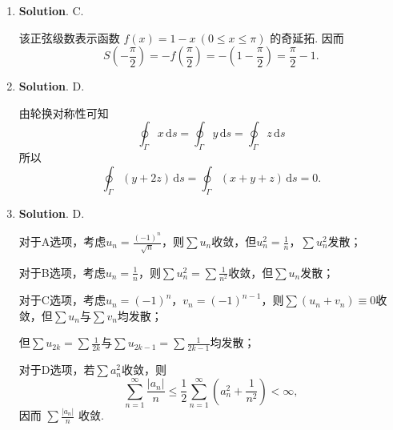 \documentclass[../main.tex]{subfiles}
\begin{document}
\begin{enumerate}
    \item \textbf{Solution}. C.

          该正弦级数表示函数 \(f(x)=1-x\ (0\le x\le \pi)\) 的奇延拓. 因而
          \[
              S\left(-\frac{\pi}{2}\right)=-f\left(\frac{\pi}{2}\right)
              =-\left(1-\frac{\pi}{2}\right)
              =\frac{\pi}{2}-1.
          \]

    \item \textbf{Solution}. D.

          由轮换对称性可知
          \[
              \oint_\Gamma x\,\mathrm{d}s=\oint_\Gamma y\,\mathrm{d}s=\oint_\Gamma z\,\mathrm{d}s
          \]
          所以
          \[
              \oint_\Gamma (y+2z)\,\mathrm{d}s=\oint_\Gamma (x+y+z)\,\mathrm{d}s=0.
          \]

    \item \textbf{Solution}. D.

          对于A选项，考虑$u_n=\frac{(-1)^n}{\sqrt{n}}$，则$\sum u_n$收敛，但$u_n^2=\frac{1}{n}$，$\sum u_n^2$发散；

          对于B选项，考虑$u_n=\frac{1}{n}$，则$\sum u_n^2=\sum \frac{1}{n^2}$收敛，但$\sum u_n$发散；

          对于C选项，考虑$u_n=(-1)^n$，$v_n=(-1)^{n-1}$，则$\sum (u_n+v_n)\equiv0$收敛，但$\sum u_n$与$\sum v_n$均发散；

          但$\sum u_{2k}=\sum \frac{1}{2k}$与$\sum u_{2k-1}=\sum \frac{1}{2k-1}$均发散；

          对于D选项，若$\sum a_n^2$收敛，则
          \[
              \sum_{n=1}^{\infty}\frac{|a_n|}{n}
              \le \frac{1}{2}\sum_{n=1}^{\infty}\left(a_n^2+\frac{1}{n^2}\right) < \infty,
          \]
          因而 \(\sum \frac{|a_n|}{n}\) 收敛.

\end{enumerate}
\end{document}

